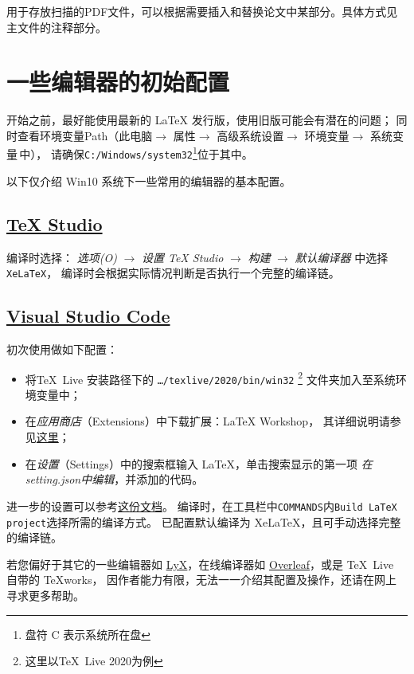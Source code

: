 \subsubsection{}
用于存放扫描的PDF文件，可以根据需要插入和替换论文中某部分。具体方式见主文件的注释部分。

\section{一些编辑器的初始配置}
开始之前，最好能使用最新的 \LaTeX{} 发行版，使用旧版可能会有潜在的问题；
同时查看环境变量Path（此电脑$\to$ 属性$\to$ 高级系统设置$\to$
环境变量$\to$ 系统变量\,中），
请确保\texttt{C:/Windows/system32}\footnote{盘符 C 表示系统所在盘}位于其中。

以下仅介绍 Win10 系统下一些常用的编辑器的基本配置。
\subsection{\href{http://texstudio.sourceforge.net}{\TeX{} Studio}}
编译时选择\XeLaTeX{}：
\emph{选项(O)} $\to$ \emph{设置 TeX Studio} $\to$
\emph{构建} $\to$ \emph{默认编译器} 中选择\texttt{XeLaTeX}，
编译时会根据实际情况判断是否执行一个完整的编译链。

\subsection{\href{https://code.visualstudio.com}{Visual Studio Code}}
初次使用做如下配置：
\begin{itemize}
	\item 将\TeX\ Live 安装路径下的 \texttt{\dots /texlive/2020/bin/win32} \footnote{这里以\TeX\ Live 2020为例} 文件夹加入至系统环境变量中；
	\item 在\emph{应用商店}（Extensions）中下载扩展：\textsf{LaTeX Workshop}，
			其详细说明请参见\href{https://github.com/James-Yu/LaTeX-Workshop}{这里}；%
	\item 在\emph{设置}（Settings）中的搜索框输入 LaTeX，单击搜索显示的第一项
			\emph{在setting.json中编辑}，并添加的代码。
\end{itemize}
进一步的设置可以参考\href{https://github.com/EthanDeng/vscode-latex/}{这份文档}。
编译时，在工具栏中\texttt{COMMANDS}内\texttt{Build LaTeX project}选择所需的编译方式。
已配置默认编译为 XeLaTeX，且可手动选择完整的编译链。

若您偏好于其它的一些编辑器如 \href{http://www.lyx.org/}{LyX}，在线编译器如
\href{https://www.overleaf.com/}{Overleaf}，或是 \TeX\ Live 自带的 TeXworks，
因作者能力有限，无法一一介绍其配置及操作，还请在网上寻求更多帮助。